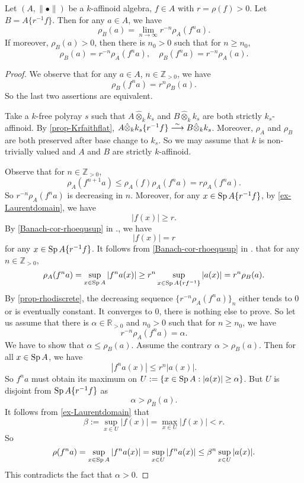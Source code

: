 \begin{lemma}\label{lma-rhoBandrhoA}
    Let $(A,\|\bullet\|)$ be a $k$-affinoid algebra, $f\in A$ with $r=\rho(f)>0$. Let $B=A\{r^{-1}f\}$. Then for any $a\in A$, we have
    \[
        \rho_B(a)=\lim_{n\to\infty}r^{-n}\rho_A(f^na).
    \]  
    If moreover, $\rho_B(a)>0$, then there is $n_0>0$ such that for $n\geq n_0$,
    \[
        \rho_B(a)=r^{-n}\rho_A(f^na),\quad   \rho_B(f^na)=r^{-n}\rho_A(a).
    \]
\end{lemma}
\begin{proof}
    We observe that for any $a\in A$, $n\in \mathbb{Z}_{>0}$, we have
    \[
        \rho_B(f^na)=r^n\rho_B(a).
    \]
    So the last two assertions are equivalent.

    Take a $k$-free polyray $s$ such that $A\hat{\otimes}_k k_s$ and $B\hat{\otimes}_k k_s$ are both strictly $k_s$-affinoid. By \cref{prop-Krfaithflat}, $A\hat{\otimes}_k k_s\{r^{-1}f\}\stackrel{\sim}{\longrightarrow} B\hat{\otimes}_k k_s$. Moreover, $\rho_A$ and $\rho_B$ are both preserved after base change to $k_s$. So we may assume that $k$ is non-trivially valued and $A$ and $B$ are strictly $k$-affinoid.

    Observe that  for $n\in \mathbb{Z}_{>0}$, 
    \[
        \rho_A(f^{n+1}a)\leq \rho_A(f)\rho_A(f^na)=r   \rho_A(f^na). 
    \]
    So $r^{-n}\rho_A(f^{n}a)$ is decreasing in $n$. Moreover, for any $x\in \operatorname{Sp} A\{r^{-1}f\}$, by \cref{ex-Laurentdomain}, we have
    \[
        |f(x)|\geq r. 
    \]
    By \cref{Banach-cor-rhoequsup} in ., we have
    \[
        |f(x)|=r  
    \]
    for any $x\in \operatorname{Sp} A\{r^{-1}f\}$. It follows from \cref{Banach-cor-rhoequsup} in . that for any $n\in \mathbb{Z}_{>0}$,
    \[
        \rho_A(f^na)=\sup_{x\in \operatorname{Sp} A}|f^na(x)|\geq  r^n\sup_{x\in \operatorname{Sp} A\{rf^{-1}\}}|a(x)|=r^n\rho_B(a). 
    \]
    By \cref{prop-rhodiscrete}, the decreasing sequence $\{r^{-n}\rho_A(f^na)\}_n$ either tends to $0$ or is eventually constant. It converges to $0$, there is nothing else to prove. So let us assume that there is $\alpha\in \mathbb{R}_{>0}$ and $n_0>0$ such that for $n\geq n_0$, we have
    \[
        r^{-n}\rho_A(f^na)=\alpha.  
    \]
    We have to show that $\alpha\leq \rho_B(a)$. Assume the contrary $\alpha>\rho_B(a)$. Then for all $x\in \operatorname{Sp} A$, we have
    \[
        |f^na(x)|\leq r^n|a(x)|.  
    \] 
    So $f^na$ must obtain its maximum on $U:=\{x\in \operatorname{Sp} A: |a(x)|\geq \alpha\}$. But $U$ is disjoint from $\operatorname{Sp} A\{r^{-1}f\}$ as
    \[
        \alpha>\rho_B(a).
    \]
    It follows from \cref{ex-Laurentdomain} that 
    \[
        \beta:=\sup_{x\in U}|f(x)|=\max_{x\in U}|f(x)|<r.  
    \]
    So
    \[
        \rho(f^na)=\sup_{x\in \operatorname{Sp} A}|f^na(x)|=\sup_{x\in U}|f^na(x)|\leq \beta^n \sup_{x\in U}|a(x)|.   
    \]
    This contradicts the fact that $\alpha>0$.
\end{proof}

